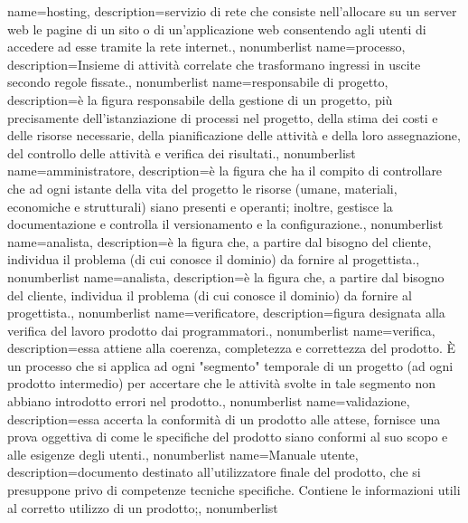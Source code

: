 {
name={hosting},
description={servizio di rete che consiste nell'allocare su un server web le pagine di un sito o di un'applicazione web consentendo agli utenti di accedere ad esse tramite la rete internet.},
nonumberlist 
}
{
name={processo},
description={Insieme di attività correlate che trasformano ingressi in uscite secondo regole fissate.},
nonumberlist 
}
{
name={responsabile di progetto},
description={è la figura responsabile della gestione di un progetto, più precisamente dell'istanziazione di processi nel progetto, della stima dei costi e delle risorse necessarie, della pianificazione delle attività e della loro assegnazione, del controllo delle attività e verifica dei risultati.},
nonumberlist 
}
{
name={amministratore},
description={è la figura che ha il compito di controllare che ad ogni istante della vita del progetto le risorse (umane, materiali, economiche e strutturali) siano presenti e operanti; inoltre, gestisce la documentazione e controlla il versionamento e la configurazione.},
nonumberlist 
}
{
name={analista},
description={è la figura che, a partire dal bisogno del cliente, individua il problema (di cui conosce il dominio) da fornire al progettista.},
nonumberlist 
}
{
	name={analista},
	description={è la figura che, a partire dal bisogno del cliente, individua il problema (di cui conosce il dominio) da fornire al progettista.},
	nonumberlist 
}
{
name={verificatore},
description={figura designata alla verifica del lavoro prodotto dai programmatori.},
nonumberlist 
}
{
name={verifica},
description={essa attiene alla coerenza, completezza e correttezza del prodotto. È un processo che si applica ad ogni "segmento" temporale di un progetto (ad ogni prodotto intermedio) per accertare che le attività svolte in tale segmento non abbiano introdotto errori nel prodotto.},
nonumberlist 
}
{
name={validazione},
description={essa accerta la conformità di un prodotto alle attese, fornisce una prova oggettiva di come le specifiche del prodotto siano conformi al suo scopo e alle esigenze degli utenti.},
nonumberlist 
}
{
name={Manuale utente},
description={documento destinato all'utilizzatore finale del prodotto, che si presuppone privo di competenze tecniche specifiche. Contiene le informazioni utili al corretto utilizzo di un prodotto;},
nonumberlist 
}
